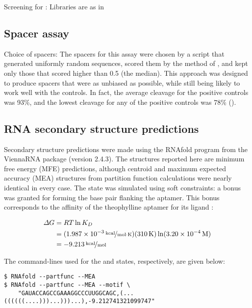 \documentclass[10pt,oneside]{article}
\begin{document}
Screening for \ligrnaB{}: Libraries are as in 

\subsection{Spacer assay}

Choice of spacers: The spacers for this assay were chosen by a script that generated uniformly random sequences, scored them by the method of , and kept only those that scored higher than 0.5 (the median).  This approach was designed to produce spacers that were as unbiased as possible, while still being likely to work well with the controls.  In fact, the average cleavage for the positive controls was 93\%, and the lowest cleavage for any of the positive controls was 78\% ().

\subsection{RNA secondary structure predictions}

Secondary structure predictions were made using the RNAfold program from the ViennaRNA package (version 2.4.3).  The structures reported here are minimum free energy (MFE) predictions, although centroid and maximum expected accuracy (MEA) structures from partition function calculations were nearly identical in every case.  The \holo{} state was simulated using soft constraints: a  bonus was granted for forming the base pair flanking the aptamer.  This bonus corresponds to the  affinity of the theophylline aptamer for its ligand \autocite{jenison1994}:

\begin{align*}
\Delta G
    &= RT \ln K_D \\
    &= (\unitfrac[\mathrm{1.987 \times 10^{-3}}]{kcal}{mol \cdot K}) 
       (\unit[\mathrm{310}]{K}) 
       \ln (\unit[\mathrm{3.20 \times 10^{-4}}]{M}) \\
    &= \unitfrac[\mathrm{-9.213}]{kcal}{mol} \\
\end{align*}

The command-lines used for the \apo{} and \holo{} states, respectively, are given below:

\begin{verbatim}
$ RNAfold --partfunc --MEA
$ RNAfold --partfunc --MEA --motif \
    "GAUACCAGCCGAAAGGCCCUUGGCAGC,(...((((((....)))...)))...),-9.212741321099747"
\end{verbatim}
\end{document}
